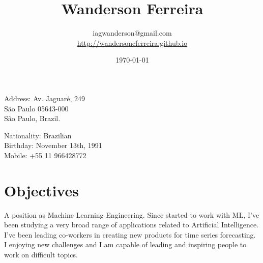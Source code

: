 \documentclass[10pt]{article}
\title{\bfseries\Huge Wanderson Ferreira}
\author{iagwanderson@gmail.com \\
\href{http://wandersoncferreira.github.io}{http://wandersoncferreira.github.io}}
\date{\today}
\begin{document}
\maketitle

\begin{center}
  \begin{minipage}{.7\textwidth}
    Address: Av. Jaguaré, 249\\
    São Paulo 05643-000\\
    São Paulo, Brazil.
  \end{minipage}%
  \begin{minipage}{.5\textwidth}
    Nationality: Brazilian\\
    Birthday: November 13th, 1991\\
    Mobile: +55 11 966428772
  \end{minipage}
\end{center}

\section*{Objectives}
A position as Machine Learning Engineering. Since started to work with ML, I've been studying a very broad range of applications related to Artificial Intelligence. I've been leading co-workers in creating new products for time series forecasting. I enjoying new challenges and I am capable of leading and inspiring people to work on difficult topics.
\end{document}
